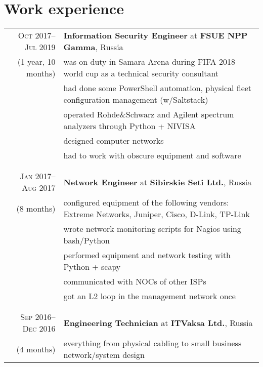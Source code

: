 \documentclass[a4paper,11pt]{article}
\begin{document}
  \section{Work experience}
    \begin{longtable}{r|p{}}
      \textsc{Oct 2017--Jul 2019} & \large \sffamily \textbf{Information Security Engineer} at \textbf{FSUE NPP Gamma},
                                    Russia \\
      (1 year, 10 months) & was on duty in Samara Arena during FIFA 2018 world cup as a technical security
                            consultant                                                                                \\
                          & had done some PowerShell automation, physical fleet configuration management (w/Saltstack)\\
                          & operated Rohde\&Schwarz and Agilent spectrum analyzers through Python + NIVISA            \\
                          & designed computer networks                                                                \\
                          & had to work with obscure equipment and software                                           \\
      \\&\\
      \textsc{Jan 2017--Aug 2017} & \large \sffamily \textbf{Network Engineer} at \textbf{Sibirskie Seti Ltd.}, Russia\\
      (8 months) & configured equipment of the following vendors: Extreme Networks, Juniper, Cisco, D-Link, TP-Link   \\
                 & wrote network monitoring scripts for Nagios using bash/Python                                      \\
                 & performed equipment and network testing with Python + scapy                                        \\
                 & communicated with NOCs of other ISPs                                                               \\
                 & got an L2 loop in the management network once                                                      \\
      \\&\\
      \textsc{Sep 2016--Dec 2016} & \large \sffamily \textbf{Engineering Technician} at \textbf{ITVaksa Ltd.}, Russia \\
      (4 months) & everything from physical cabling to small business network/system design                           \\
    \end{longtable}
\end{document}
